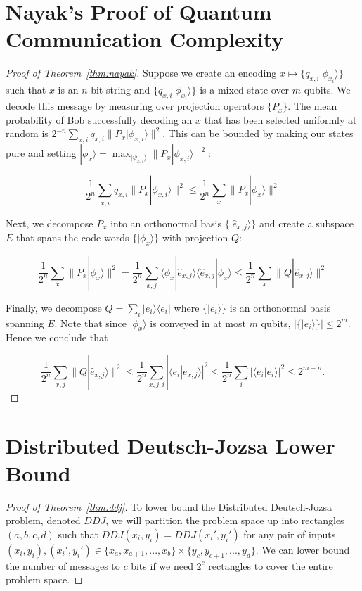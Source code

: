\documentclass[a4paper]{article}
\begin{document}
    \begin{appendices}

    \section{Nayak's Proof of Quantum Communication Complexity}
    \label{sec:nayak}

    \begin{proof}[Proof of Theorem~\ref{thm:nayak}]
        Suppose we create an encoding $x \mapsto \{q_{x,i}|\phi_{x_i}\rangle\}$ such that $x$ is an $n$-bit string and $\{q_{x,i}|\phi_{x_i}\rangle\}$ is a mixed state over $m$ qubits. We decode this message by measuring over projection operators $\{P_x\}$. The mean probability of Bob successfully decoding an $x$ that has been selected uniformly at random is $2^{-n}\sum_{x, i}q_{x, i}\|P_x|\phi_{x,i}\rangle\|^2$. This can be bounded by making our states pure and setting $|\phi_x\rangle = \max_{|\psi_{x, i}\rangle}\|P_x|\phi_{x, i}\rangle\|^2$:

        $$\frac{1}{2^n}\sum_{x, i}q_{x, i}\|P_x|\phi_{x,i}\rangle\|^2 \leq \frac{1}{2^n}\sum_{x}\|P_x|\phi_{x}\rangle\|^2$$

        Next, we decompose $P_x$ into an orthonormal basis $\{|\hat{e}_{x, j}\rangle\}$ and create a subspace $E$ that spans the code words $\{|\phi_x\rangle\}$ with projection $Q$:

        $$\frac{1}{2^n}\sum_{x}\|P_x|\phi_{x}\rangle\|^2 = \frac{1}{2^n}\sum_{x, j}\langle\phi_x|\hat{e}_{x, j}\rangle\langle\hat{e}_{x, j}|\phi_x\rangle \leq \frac{1}{2^n}\sum_{x}\|Q|\hat{e}_{x, j}\rangle\|^2$$

        Finally, we decompose $Q = \sum_i|e_i\rangle\langle e_i|$ where $\{|e_i\rangle\}$ is an orthonormal basis spanning $E$. Note that since $|\phi_x\rangle$ is conveyed in at most $m$ qubits, $|\{|e_i\rangle\}| \leq 2^m$. Hence we conclude that

        $$\frac{1}{2^n}\sum_{x, j}\|Q|\hat{e}_{x, j}\rangle\|^2 \leq \frac{1}{2^n}\sum_{x, j, i}|\langle e_i|e_{x, j}\rangle|^2 \leq \frac{1}{2^n}\sum_{i}|\langle e_i|e_i\rangle|^2 \leq 2^{m - n}.$$
    \end{proof}

    \section{Distributed Deutsch-Jozsa Lower Bound}
    \label{sec:ddj-lower-bound}

    \begin{proof}[Proof of Theorem~\ref{thm:ddj}]
        To lower bound the Distributed Deutsch-Jozsa problem, denoted $DDJ$, we will partition the problem space up into rectangles $(a, b, c, d)$ such that $DDJ(x_i, y_i) = DDJ(x_i', y_i')$ for any pair of inputs $(x_i, y_i), (x_i', y_i') \in \{x_a,x_{a + 1},...,x_{b}\} \times \{y_c, y_{c+1},...,y_d\}$. We can lower bound the number of messages to $c$ bits if we need $2^c$ rectangles to cover the entire problem space.


\end{proof}
\end{appendices}
\end{document}
